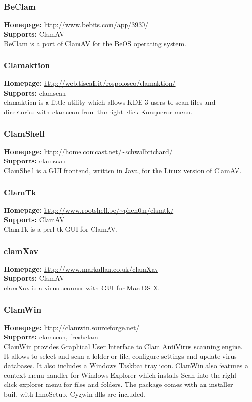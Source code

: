 \documentclass[a4paper,titlepage,12pt]{article}
\begin{document}
    \subsubsection{BeClam}
    \textbf{Homepage:} \url{http://www.bebits.com/app/3930/}\\
    \textbf{Supports:} ClamAV\\[4pt]
    BeClam is a port of ClamAV for the BeOS operating system.

    \subsubsection{Clamaktion}
    \textbf{Homepage:} \url{http://web.tiscali.it/rospolosco/clamaktion/}\\
    \textbf{Supports:} clamscan\\[4pt]
    clamaktion is a little utility which allows KDE 3 users to scan files
    and directories with clamscan from the right-click Konqueror menu.

    \subsubsection{ClamShell}
    \textbf{Homepage:} \url{http://home.comcast.net/~schwalbrichard/}\\
    \textbf{Supports:} clamscan\\[4pt]
    ClamShell is a GUI frontend, written in Java, for the Linux version of
    ClamAV.

    \subsubsection{ClamTk}
    \textbf{Homepage:} \url{http://www.rootshell.be/~phen0m/clamtk/}\\
    \textbf{Supports:} ClamAV\\[4pt]
    ClamTk is a perl-tk GUI for ClamAV.

    \subsubsection{clamXav} \label{clamxav}
    \textbf{Homepage:} \url{http://www.markallan.co.uk/clamXav}\\
    \textbf{Supports:} ClamAV\\[4pt]
    clamXav is a virus scanner with GUI for Mac OS X.

    \subsubsection{ClamWin} \label{clamwin}
    \textbf{Homepage:} \url{http://clamwin.sourceforge.net/}\\
    \textbf{Supports:} clamscan, freshclam\\[4pt]
    ClamWin provides Graphical User Interface to Clam AntiVirus scanning
    engine. It allows to select and scan a folder or file, configure settings
    and update virus databases. It also includes a Windows Taskbar tray icon.
    ClamWin also features a context menu handler for Windows Explorer which
    installs Scan into the right-click explorer menu for files and folders.
    The package comes with an installer built with InnoSetup. Cygwin dlls
    are included.
\end{document}
